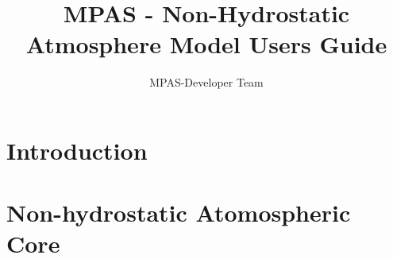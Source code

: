 \documentclass[11pt]{report}
\begin{document}
\title{MPAS - Non-Hydrostatic Atmosphere Model Users Guide}



\author{MPAS-Developer Team}

\maketitle
\tableofcontents

\part{Introduction}




\part{Non-hydrostatic Atomospheric Core}






\end{document}
